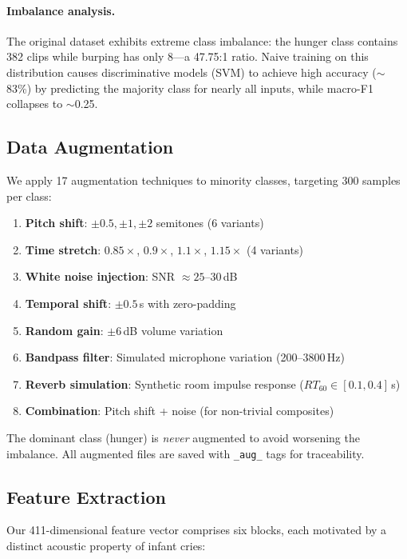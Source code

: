 \documentclass[11pt,a4paper]{article}
\begin{document}
\paragraph{Imbalance analysis.}
The original dataset exhibits extreme class imbalance: the hunger class
contains 382 clips while burping has only 8---a 47.75:1 ratio. Naive
training on this distribution causes discriminative models (SVM) to
achieve high accuracy ($\sim$83\%) by predicting the majority class for
nearly all inputs, while macro-F1 collapses to $\sim$0.25.

\subsection{Data Augmentation}
\label{sec:augmentation}

We apply 17 augmentation techniques to minority classes, targeting 300
samples per class:

\begin{enumerate}[nosep]
  \item \textbf{Pitch shift}: $\pm 0.5, \pm 1, \pm 2$ semitones (6 variants)
  \item \textbf{Time stretch}: $0.85\times$, $0.9\times$, $1.1\times$, $1.15\times$ (4 variants)
  \item \textbf{White noise injection}: SNR $\approx 25$--$30$\,dB
  \item \textbf{Temporal shift}: $\pm 0.5$\,s with zero-padding
  \item \textbf{Random gain}: $\pm 6$\,dB volume variation
  \item \textbf{Bandpass filter}: Simulated microphone variation (200--3800\,Hz)
  \item \textbf{Reverb simulation}: Synthetic room impulse response ($RT_{60} \in [0.1, 0.4]$\,s)
  \item \textbf{Combination}: Pitch shift + noise (for non-trivial composites)
\end{enumerate}

\noindent
The dominant class (hunger) is \textit{never} augmented to avoid
worsening the imbalance. All augmented files are saved with
\texttt{\_aug\_} tags for traceability.

\subsection{Feature Extraction}
\label{sec:features}

Our 411-dimensional feature vector comprises six blocks, each motivated
by a distinct acoustic property of infant cries:
\end{document}

